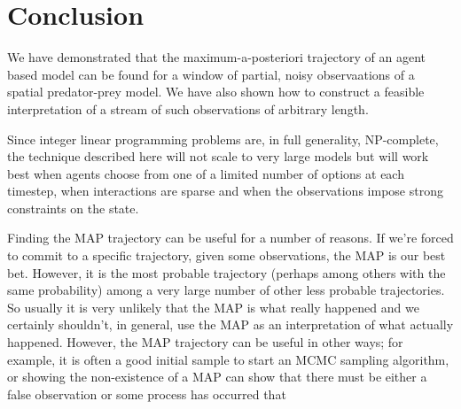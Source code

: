 \documentclass{article}
\begin{document}
\section{Conclusion}

We have demonstrated that the maximum-a-posteriori trajectory of an agent based model can be found for a window of partial, noisy observaations of a spatial predator-prey model. We have also shown how to construct a feasible interpretation of a stream of such observations of arbitrary length.

Since integer linear programming problems are, in full generality, NP-complete, the technique described here will not scale to very large models but will work best when agents choose from one of a limited number of options at each timestep, when interactions are sparse and when the observations impose strong constraints on the state.

Finding the MAP trajectory can be useful for a number of reasons. If we're forced to commit to a specific trajectory, given some observations, the MAP is our best bet. However, it is the most probable trajectory (perhaps among others with the same probability) among a very large number of other less probable trajectories. So usually it is very unlikely that the MAP is what really happened and we certainly shouldn't, in general, use the MAP as an interpretation of what actually happened. However, the MAP trajectory can be useful in other ways; for example, it is often a good initial sample to start an MCMC sampling algorithm, or showing the non-existence of a MAP can show that there must be either a false observation or some process has occurred that 


%
% 


\end{document}
